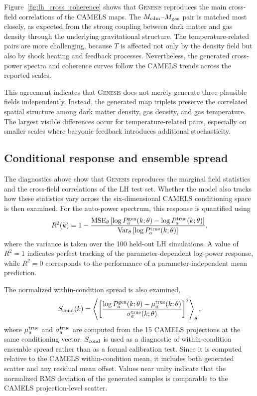 \documentclass{article}
\newcommand{\Mcdm}{M_{\rm cdm}}
\newcommand{\Mgas}{M_{\rm gas}}
\newcommand{\Tgas}{T}
\begin{document}
Figure~\ref{fig:lh_cross_coherence} shows that \textsc{Genesis}
reproduces the main cross-field correlations of the CAMELS maps. The
$\Mcdm$--$\Mgas$ pair is matched most closely, as expected from the
strong coupling between dark matter and gas density through the
underlying gravitational structure. The temperature-related pairs are
more challenging, because $\Tgas$ is affected not only by the density
field but also by shock heating and feedback processes. Nevertheless,
the generated cross-power spectra and coherence curves follow the
CAMELS trends across the reported scales.

This agreement indicates that \textsc{Genesis} does not merely
generate three plausible fields independently. Instead, the generated
map triplets preserve the correlated spatial structure among dark
matter density, gas density, and gas temperature. The largest visible
differences occur for temperature-related pairs, especially on smaller
scales where baryonic feedback introduces additional stochasticity.

\subsection{Conditional response and ensemble spread}
\label{sec:eval_response}

The diagnostics above show that \textsc{Genesis} reproduces the
marginal field statistics and the cross-field correlations of the LH
test set. Whether the model also tracks how these statistics vary
across the six-dimensional CAMELS conditioning space is then examined.
For the auto-power spectrum, this response is quantified using
\begin{equation}
  R^2(k)
  =
  1 -
  \frac{
    {\rm MSE}_{\theta}
    \left[
      \log P_a^{\rm gen}(k;\theta)
      -
      \log P_a^{\rm true}(k;\theta)
    \right]
  }{
    {\rm Var}_{\theta}
    \left[
      \log P_a^{\rm true}(k;\theta)
    \right]
  },
  \label{eq:lh_r2}
\end{equation}
where the variance is taken over the 100 held-out LH simulations.
A value of $R^2=1$ indicates perfect tracking of the
parameter-dependent log-power response, while $R^2=0$ corresponds to
the performance of a parameter-independent mean prediction.

The normalized within-condition spread is also examined,
\begin{equation}
  S_{\rm cond}(k)
  =
  \left\langle
  \left[
  \frac{
    \log P_a^{\rm gen}(k;\theta)
    -
    \mu_a^{\rm true}(k;\theta)
  }{
    \sigma_a^{\rm true}(k;\theta)
  }
  \right]^2
  \right\rangle_{\theta},
  \label{eq:scond}
\end{equation}
where $\mu_a^{\rm true}$ and $\sigma_a^{\rm true}$ are computed from
the 15 CAMELS projections at the same conditioning vector. $S_{\rm cond}$
is used as a diagnostic of within-condition ensemble spread
rather than as a formal calibration test. Since it is computed relative
to the CAMELS within-condition mean, it includes both generated
scatter and any residual mean offset. Values near unity indicate that
the normalized RMS deviation of the generated samples is comparable
to the CAMELS projection-level scatter.
\end{document}
